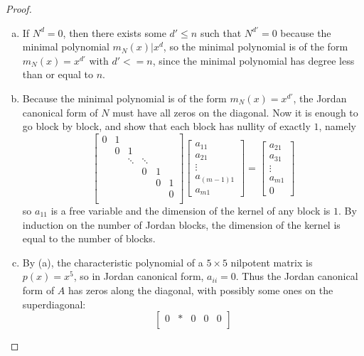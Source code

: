 \documentclass{article}
\begin{document}
\begin{proof} ~
  \begin{enumerate}[(a)]
    \item If $N^d = 0$, then there exists some $d' \leq n$ such that
    $N^{d'} = 0$ because the minimal polynomial $m_N(x) | x^d$, so the minimal
    polynomial is of the form $m_N(x) = x^{d'}$ with $d' <= n$, since the
    minimal polynomial has degree less than or equal to $n$.
    \item Because the minimal polynomial is of the form $m_N(x) = x^{d'}$,
    the Jordan canonical form of $N$ must have all zeros on the diagonal.
    Now it is enough to go block by block, and show that each block has nullity
    of exactly $1$, namely \[
      \begin{bmatrix}
        0 & 1 & \ & \ & \ & \\\
        \ & 0 & 1 & \ & \ & \\\
        \ & \ & \ddots & \ddots & \ & \ \\
        \ & \ & \ & 0 & 1 & \ \\
        \ & \ & \ & \ & 0 & 1\\
        \ & \ & \ & \ & \ & 0\\
      \end{bmatrix}\begin{bmatrix}
        a_{11} \\ a_{21} \\ \vdots \\ a_{(m-1)1} \\ a_{m1}
      \end{bmatrix} = \begin{bmatrix}
        a_{21} \\ a_{31} \\ \vdots \\ a_{m1} \\ 0
      \end{bmatrix}
    \] so $a_11$ is a free variable and the dimension of the kernel of any block is $1$.
    By induction on the number of Jordan blocks, the dimension of the kernel is
    equal to the number of blocks.
    \item By (a), the characteristic polynomial of a $5 \times 5$ nilpotent
    matrix is $p(x) = x^5$, so in Jordan canonical form, $a_{ii} = 0$. Thus
    the Jordan canonical form of $A$ has
    zeros along the diagonal, with possibly some ones on the superdiagonal: \[
      \begin{bmatrix}
        0 & * & 0 & 0 & 0 \\

\end{bmatrix}\]
\end{enumerate}
\end{proof}
\end{document}
